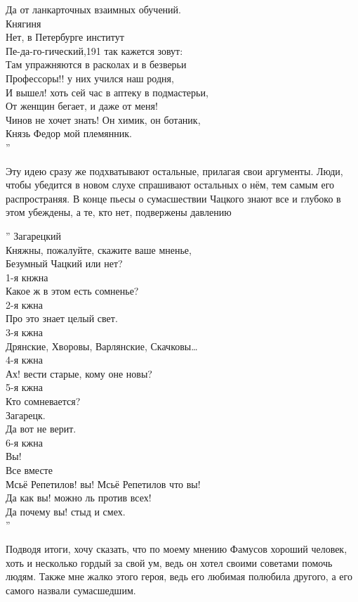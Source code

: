 \documentclass[12pt,a4paper]{article}
\begin{document}
Да от ланкарточных взаимных обучений.\\
Княгиня\\
Нет, в Петербурге институт\\
Пе-да-го-гический,191 так кажется зовут:\\
Там упражняются в расколах и в безверьи\\
Профессоры!! у них учился наш родня,\\
И вышел! хоть сей час в аптеку в подмастерьи,\\
От женщин бегает, и даже от меня!\\
Чинов не хочет знать! Он химик, он ботаник,\\
Князь Федор мой племянник.\\
''

Эту идею сразу же подхватывают остальные, прилагая свои аргументы. Люди, чтобы убедится в новом слухе спрашивают остальных о нём, тем самым его распространяя. В конце пьесы о сумасшествии Чацкого знают все и глубоко в этом убеждены, а те, кто нет, подвержены давлению

''
Загарецкий\\
Княжны, пожалуйте, скажите ваше мненье,\\
Безумный Чацкий или нет?\\
1-я кнжна\\
Какое ж в этом есть сомненье?\\
2-я кжна\\
Про это знает целый свет.\\
3-я кжна\\
Дрянские, Хворовы, Варлянские, Скачковы…\\
4-я кжна\\
Ах! вести старые, кому оне новы?\\
5-я кжна\\
Кто сомневается?\\
Загарецк.\\
Да вот не верит.\\
6-я кжна\\
Вы!\\
Все вместе\\
Мсьё Репетилов! вы! Мсьё Репетилов что вы!\\
Да как вы! можно ль против всех!\\
Да почему вы! стыд и смех.\\
''



Подводя итоги, хочу сказать, что по моему мнению Фамусов хороший человек, хоть и несколько гордый за свой ум, ведь он хотел своими советами помочь людям. Также мне жалко этого героя, ведь его любимая полюбила другого, а его самого назвали сумасшедшим.
\end{document}
